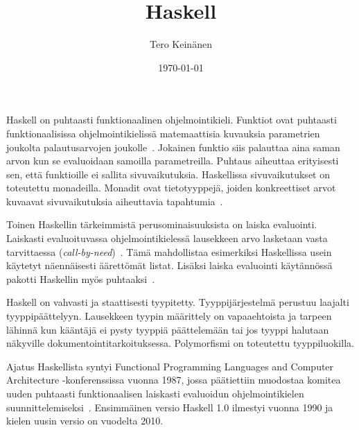 \documentclass[finnish]{tktltiki2}
\title{Haskell}
\author{Tero Keinänen}
\date{\today}
\theoremstyle{definition}
\theoremstyle{remark}
\begin{document}

\frontmatter      %

\maketitle        %



\mainmatter       %



Haskell on puhtaasti funktionaalinen ohjelmointikieli. Funktiot ovat puhtaasti funktionaalisissa ohjelmointikielissä matemaattisia kuvauksia parametrien joukolta palautusarvojen joukolle~\cite[s.~1]{Sab98}. Jokainen funktio siis palauttaa aina saman arvon kun se evaluoidaan samoilla parametreilla. Puhtaus aiheuttaa erityisesti sen, että funktioille ei sallita sivuvaikutuksia. 
Haskellissa sivuvaikutukset on toteutettu monadeilla. Monadit ovat tietotyyppejä, joiden konkreettiset arvot kuvaavat sivuvaikutuksia aiheuttavia tapahtumia~\cite[luku~7]{Mar10}.

Toinen Haskellin tärkeimmistä perusominaisuuksista on laiska evaluointi. Laiskasti evaluoituvassa ohjelmointikielessä lausekkeen arvo lasketaan vasta tarvittaessa (\emph{call-by-need})~\cite[s.~12-8]{Hud07}. Tämä mahdollistaa esimerkiksi Haskellissa usein käytetyt näennäisesti äärettömät listat. Lisäksi laiska evaluointi käytännössä pakotti Haskellin myös puhtaaksi~\cite[s.~12-8]{Hud07}.

Haskell on vahvasti ja staattisesti tyypitetty. Tyyppijärjestelmä perustuu laajalti tyyppipäättelyyn. Lausekkeen tyypin määrittely on vapaaehtoista ja tarpeen lähinnä kun kääntäjä ei pysty tyyppiä päättelemään tai jos tyyppi halutaan näkyville dokumentointitarkoituksessa. Polymorfismi on toteutettu tyyppiluokilla.

Ajatus Haskellista syntyi Functional Programming Languages and Computer Architecture -konferenssissa vuonna 1987, jossa päätiettiin muodostaa komitea uuden puhtaasti funktionaalisen laiskasti evaluoidun ohjelmointikielen suunnittelemiseksi~\cite[s.~12-1]{Hud07}. Ensimmäinen versio Haskell 1.0 ilmestyi vuonna 1990 ja kielen uusin versio on vuodelta 2010.
\end{document}
